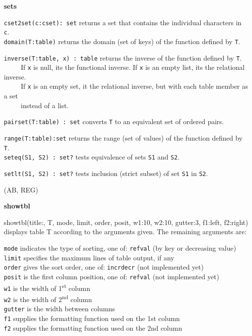 {\sffamily\bfseries
sets}

\texttt{cset2set(c:cset): set} returns a set that contains the
individual characters in \texttt{c}.\\
\texttt{domain(T:table)} returns the domain (set of keys) of the
function defined by \texttt{T}.

\texttt{inverse(T:table, x) : table} returns the inverse of the function
defined by \texttt{T}.\\
 \ \ \ \ \ If \texttt{x} is null, it{\textquotesingle}s the functional
inverse. If \texttt{x} is an empty list, it{\textquotesingle}s the
relational inverse.\\
 \ \ \ \ \ If \texttt{x} is an empty set, it the relational inverse, but
with each table member as a set\\
 \ \ \ \ \ instead of a list.

\texttt{pairset(T:table) : set} converts \texttt{T} to an equivalent set
of ordered pairs.

\texttt{range(T:table):set} returns the range (set of values) of the
function defined by \texttt{T}.\\
\texttt{seteq(S1, S2) : set?} tests equivalence
of sets \texttt{S1} and \texttt{S2}.

\texttt{setlt(S1, S2) : set?} tests inclusion (strict subset) of set
\texttt{S1} in \texttt{S2}. 

(AB, REG)

{\sffamily\bfseries
showtbl}

\textsf{showtbl(title:{\textquotedbl}{\textquotedbl}, T, mode, limit,
order, posit, w1:10, w2:10, gutter:3, f1:left, f2:right)} displays
table T according to the arguments given. The remaining arguments are:

\texttt{mode} indicates the type of sorting, one of:
\texttt{{\textquotedbl}ref{\textquotedbl}{\textbar}{\textquotedbl}val{\textquotedbl}}
(by key or decreasing value)\\
\texttt{limit} specifies the maximum lines of table output, if
any\\
\texttt{order} gives the sort order, one of:
\texttt{{\textquotedbl}incr{\textquotedbl}{\textbar}{\textquotedbl}decr{\textquotedbl}}
(not implemented yet)\\
\texttt{posit} is the first column position, one of:
\texttt{{\textquotedbl}ref{\textquotedbl}{\textbar}{\textquotedbl}val{\textquotedbl}}
(not implemented yet)\\
\texttt{w1} is the width of 1\textsuperscript{st} column\\
\texttt{w2} is the width of 2\textsuperscript{nd} column\\
\texttt{gutter} is the width between columns\\
\texttt{f1} supplies the formatting function used on the 1st
column\\
\texttt{f2} supplies the formatting function used on the 2nd column

